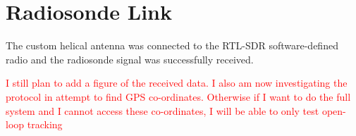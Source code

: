 \section{Radiosonde Link}

The custom helical antenna was connected to the RTL-SDR software-defined radio and the radiosonde signal was successfully received.

\textcolor{red}{I still plan to add a figure of the received data. I also am now investigating the protocol in attempt to find GPS co-ordinates. Otherwise if I want to do the full system and I cannot access these co-ordinates, I will be able to only test open-loop tracking}
